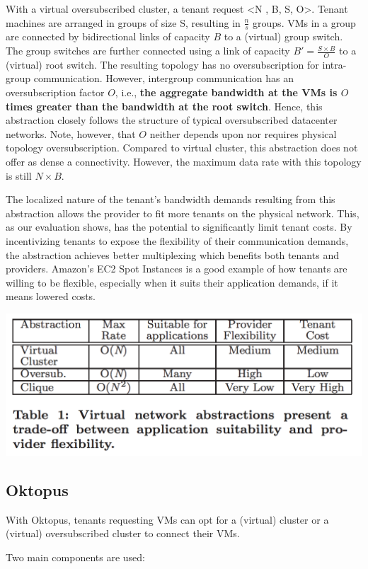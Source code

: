 With a virtual oversubscribed cluster, a tenant request
<N , B, S, O>. Tenant
machines are arranged in groups of size S, resulting in $\frac{n}{s}$ groups. VMs in a group are connected by bidirectional links
of capacity $B$ to a (virtual) group switch. The group switches
are further connected using a link of capacity $B' = \frac{S \times B}{O}$ 
to a (virtual) root switch. The resulting topology has no oversubscription
for intra-group communication. However, intergroup
communication has an oversubscription factor $O$, i.e.,
\textbf{the aggregate bandwidth at the VMs is $O$ times greater than
the bandwidth at the root switch}. Hence, this abstraction
closely follows the structure of typical oversubscribed datacenter
networks. Note, however, that $O$ neither depends upon
nor requires physical topology oversubscription. Compared to virtual cluster, this abstraction does not offer
as dense a connectivity. However, the maximum data rate
with this topology is still $N \times B$.

The localized nature of the
tenant’s bandwidth demands resulting from this abstraction
allows the provider to fit more tenants on the physical network.
This, as our evaluation shows, has the potential to
significantly limit tenant costs. By incentivizing tenants to
expose the flexibility of their communication demands, the abstraction achieves better multiplexing which benefits both
tenants and providers. Amazon’s EC2 Spot Instances is
a good example of how tenants are willing to be flexible, especially
when it suits their application demands, if it means
lowered costs.

\includegraphics[width=0.7\linewidth]{img/net_comp.png}

\subsection{Oktopus}

With Oktopus,
tenants requesting VMs can opt for a (virtual) cluster or a
(virtual) oversubscribed cluster to connect their VMs.

 Two main components are used:

